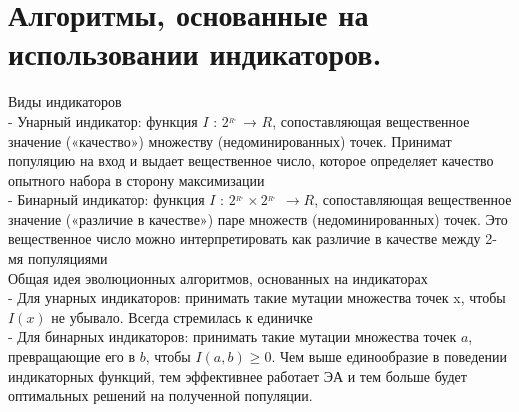 \section{Алгоритмы, основанные на использовании индикаторов.}
Виды индикаторов\\
- Унарный индикатор: функция $I$ : $2^_{R^_{n}}$ → $R$, сопоставляющая вещественное
значение («качество») множеству (недоминированных) точек.
Принимат популяцию на вход и выдает вещественное число, которое определяет качество опытного набора в сторону максимизации\\
- Бинарный индикатор: функция $I$ : $2^_{R^_{n}} × 2^_{R^_{n}} $ $→R$, сопоставляющая
вещественное значение («различие в качестве») паре множеств
(недоминированных) точек. Это вещественное число можно интерпретировать как различие в качестве между 2-мя популяциями\\

Общая идея эволюционных алгоритмов, основанных на индикаторах\\
- Для унарных индикаторов: принимать такие мутации множества точек x,
чтобы $I(x)$ не убывало. Всегда стремилась к единичке\\
- Для бинарных индикаторов: принимать такие мутации множества точек $a$,
превращающие его в $b$, чтобы $I(a,b) ≥ 0$. Чем выше единообразие в поведении индикаторных функций, тем эффективнее работает ЭА и тем больше будет оптимальных решений на полученной популяции.
